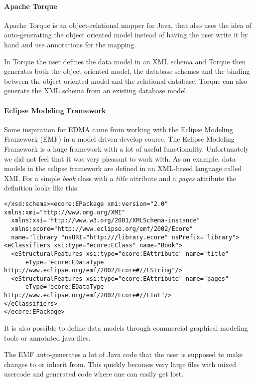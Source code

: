 \paragraph{Apache Torque}

Apache Torque is an object-relational mapper for Java, that also uses
the idea of auto-generating the object oriented model instead of having
the user write it by hand and use annotations for the mapping\cite{torque}.

In Torque the user defines the data model in an XML schema and Torque
then generates both the object oriented model, the database schemes
and the binding between the object oriented model and the relational
database. Torque can also generate the XML schema from an existing
database model.


\paragraph*{Eclipse Modeling Framework}

Some inspiration for EDMA came from working with the Eclipse Modeling
Framework (EMF) in a model driven develop course. The Eclipse Modeling
Framework is a huge framework with a lot of useful functionality.
Unfortunately we did not feel that it was very pleasant to work with.
As an example, data models in the eclipse framework are defined in
an XML-based language called XMI. For a simple \emph{book} class with
a \emph{title} attribute and a \emph{pages} attribute the definition
looks like this:

\begin{lstlisting}[basicstyle={\footnotesize},breaklines=true]
</xsd:schema><ecore:EPackage xmi:version="2.0" xmlns:xmi="http://www.omg.org/XMI"
  xmlns:xsi="http://www.w3.org/2001/XMLSchema-instance"
  xmlns:ecore="http://www.eclipse.org/emf/2002/Ecore"
  name="library "nsURI="http:///library.ecore" nsPrefix="library">
<eClassifiers xsi:type="ecore:EClass" name="Book">
  <eStructuralFeatures xsi:type="ecore:EAttribute" name="title"
      eType="ecore:EDataType http://www.eclipse.org/emf/2002/Ecore#//EString"/>
  <eStructuralFeatures xsi:type="ecore:EAttribute" name="pages"
      eType="ecore:EDataType http://www.eclipse.org/emf/2002/Ecore#//EInt"/>
</eClassifiers>
</ecore:EPackage>
\end{lstlisting}


It is also possible to define data models through commercial graphical
modeling tools or annotated java files.

The EMF auto-generates a lot of Java code that the user is supposed
to make changes to or inherit from. This quickly becomes very large
files with mixed usercode and generated code where one can easily
get lost.
